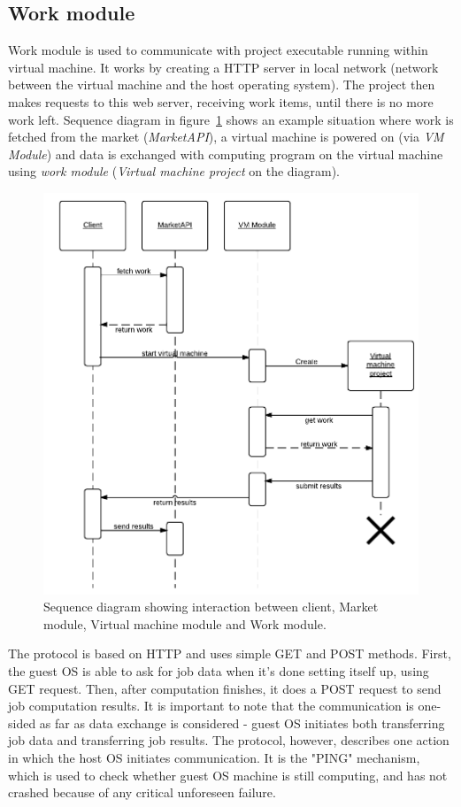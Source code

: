 \subsection{Work module}

Work module is used to communicate with project executable running within virtual machine. It works by creating a HTTP server in local network (network between the virtual machine and the host operating system). The project then makes requests to this web server, receiving work items, until there is no more work left. Sequence diagram in figure~\ref{f:clientseq} shows an example situation where work is fetched from the market (\emph{MarketAPI}), a virtual machine is powered on (via \emph{VM Module}) and data is exchanged with computing program on the virtual machine using \emph{work module} (\emph{Virtual machine project} on the diagram).

\begin{figure}
\centering
\includegraphics{diagrams/ClientSequence.pdf}
\caption{Sequence diagram showing interaction between client, Market module, Virtual machine module and Work module.}
\label{f:clientseq}
\end{figure}

The protocol is based on HTTP and uses simple GET and POST methods. First, the guest OS is able to ask for job data when it's done setting itself up, using GET request. Then, after computation finishes, it does a POST request to send job computation results. It is important to note that the communication is one-sided as far as data exchange is considered - guest OS initiates both transferring job data and transferring job results. The protocol, however, describes one action in which the host OS initiates communication. It is the "PING" mechanism, which is used to check whether guest OS machine is still computing, and has not crashed because of any critical unforeseen failure. 

